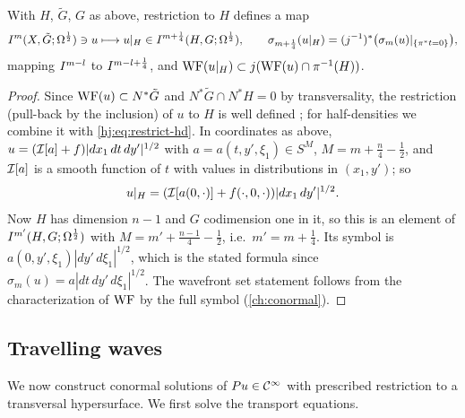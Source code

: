 \begin{proposition}\label{hj:prop:restriction}
  With $H$, $\tilde G$, $G$ as above, restriction to $H$ defines a map
  \begin{equation*}
    I^{m}(X,\tilde G;\Omega^{\frac12})\ni u\longmapsto u|_H\in I^{m+\frac14}(H,G;\Omega^{\frac12}),
    \qquad \sigma_{m+\frac14}(u|_H)=(j^{-1})^*\big(\sigma_m(u)|_{\{\pi^*t=0\}}\big),
  \end{equation*}
  mapping $I^{m-l}$ to $I^{m-l+\frac14}$, and $\operatorname{WF}(u|_H)\subset
  j(\operatorname{WF}(u)\cap\pi^{-1}(H))$.
\end{proposition}
\begin{proof}
  Since $\operatorname{WF}(u)\subset N^*\tilde G$ and $N^*\tilde G\cap N^*H=0$ by
  transversality, the restriction (pull-back by the inclusion) of $u$ to $H$ is
  well defined \cite[Theorem~8.2.4]{Hormander-I}; for half-densities we combine it
  with \eqref{hj:eq:restrict-hd}.  In coordinates as above,
  $u=(\mathcal{I}[a]+f)|dx_1\,dt\,dy'|^{1/2}$ with $a=a(t,y',\xi_1)\in S^M$,
  $M=m+\frac n4-\frac12$, and $\mathcal{I}[a]$ is a smooth function of $t$ with values in
  distributions in $(x_1,y')$; so
  \begin{equation*}
    u|_H=(\mathcal{I}[a(0,\cdot)]+f(\cdot,0,\cdot))|dx_1\,dy'|^{1/2}.
  \end{equation*}
  Now $H$ has dimension $n-1$ and $G$ codimension one in it, so this is an element
  of $I^{m'}(H,G;\Omega^{\frac12})$ with $M=m'+\frac{n-1}4-\frac12$, i.e.\
  $m'=m+\frac14$.  Its symbol is $a(0,y',\xi_1)|dy'\,d\xi_1|^{1/2}$, which is the
  stated formula since $\sigma_m(u)=a|dt\,dy'\,d\xi_1|^{1/2}$.  The wavefront set
  statement follows from the characterization of $\operatorname{WF}$ by the full symbol
  (\cref{ch:conormal}).
\end{proof}

\subsection{Travelling waves}
We now construct conormal solutions of $Pu\in\mathcal{C}^\infty$ with prescribed restriction
to a transversal hypersurface.  We first solve the transport equations.

